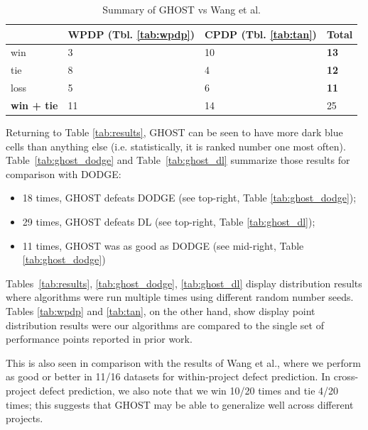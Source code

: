 \documentclass[10pt,compsoc,twocolumn]{IEEEtran}
\newcommand{\bi}{\begin{itemize}}
\newcommand{\ei}{\end{itemize}}
\begin{document}
\begin{table}[!b]
    \centering
    \caption{Summary of GHOST vs  Wang et al. \cite{wang2016automatically}}
    \label{tab:tan-summary}
    \begin{tabular}{l|ll|l}
    \toprule 
         & \textbf{WPDP (Tbl. \ref{tab:wpdp})} & \textbf{CPDP (Tbl. \ref{tab:tan})} & \textbf{Total} \\
         \midrule 
       win  & 3 & 10 & \textbf{13} \\
       tie  & 8 & 4 & \textbf{12} \\
       loss & 5 & 6 & \textbf{11} \\
       \midrule 
       \textbf{win + tie} & 11 & 14 & 25 \\
       \bottomrule
    \end{tabular}
\end{table}


Returning to
Table \ref{tab:results}, GHOST can be seen
to have more
 \colorbox{blue!20}{dark blue}
 cells than anything else (i.e. statistically, it is ranked number one most often).
Table~\ref{tab:ghost_dodge} and Table~\ref{tab:ghost_dl} summarize those results for comparison with DODGE:
\bi
\item
   18 times, GHOST defeats DODGE (see top-right, Table \ref{tab:ghost_dodge});
\item
  29 times, GHOST defeats  DL (see top-right, Table \ref{tab:ghost_dl});\item
  11 times, GHOST was as good as DODGE (see mid-right,  Table \ref{tab:ghost_dodge})
\ei
Tables~\ref{tab:results}, \ref{tab:ghost_dodge}, \ref{tab:ghost_dl} display
distribution results where algorithms  were run multiple times using different random number seeds.
Tables   \ref{tab:wpdp}
and \ref{tab:tan},
on the other hand,
show display
point distribution results were our algorithms are compared to the single set of
performance points
reported in prior work.


This is also seen in comparison with the results of Wang et al., where we perform as good or better in 11/16 datasets for within-project defect prediction. In cross-project defect prediction, we also note that we win 10/20 times and tie 4/20 times; this suggests that GHOST may be able to generalize well across different projects.
\end{document}
